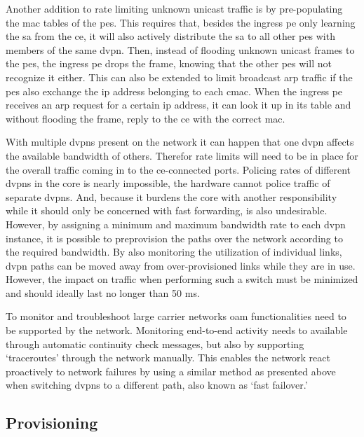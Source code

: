 Another addition to rate limiting unknown unicast traffic is by pre-populating the \acs{mac} tables of the \acp{pe}. This requires that, besides the ingress \ac{pe} only learning the \ac{sa} from the \ac{ce}, it will also actively distribute the \ac{sa} to all other \acp{pe} with members of the same \ac{dvpn}. Then, instead of flooding unknown unicast frames to the \acp{pe}, the ingress \ac{pe} drops the frame, knowing that the other \acp{pe} will not recognize it either. This can also be extended to limit broadcast \ac{arp} traffic if the \acp{pe} also exchange the \ac{ip} address belonging to each \ac{cmac}. When the ingress \ac{pe} receives an \acs{arp} request for a certain \ac{ip} address, it can look it up in its table and without flooding the frame, reply to the \ac{ce} with the correct \ac{mac}.

With multiple \acp{dvpn} present on the network it can happen that one \ac{dvpn} affects the available bandwidth of others. Therefor rate limits will need to be in place for the overall traffic coming in to the \ac{ce}-connected ports. Policing rates of different \acp{dvpn} in the core is nearly impossible, the hardware cannot police traffic of separate \acp{dvpn}. And, because it burdens the core with another responsibility while it should only be concerned with fast forwarding, is also undesirable. However, by assigning a minimum and maximum bandwidth rate to each \ac{dvpn} instance, it is possible to preprovision the paths over the network according to the required bandwidth. By also monitoring the utilization of individual links, \ac{dvpn} paths can be moved away from over-provisioned links while they are in use. However, the impact on traffic when performing such a switch must be minimized and should ideally last no longer than 50 ms.

To monitor and troubleshoot large carrier networks \ac{oam} functionalities need to be supported by the network. Monitoring end-to-end activity needs to available through automatic continuity check messages, but also by supporting `traceroutes' through the network manually. This enables the network react proactively to network failures by using a similar method as presented above when switching \acp{dvpn} to a different path, also known as `fast failover.'



\subsection{Provisioning} %
\label{sub:provisioning}

